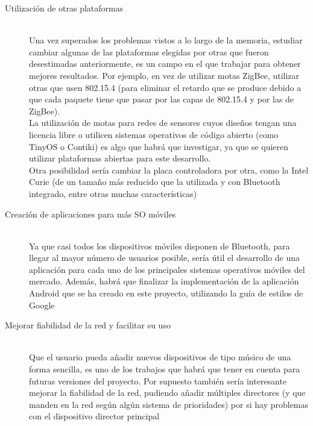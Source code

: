 \begin{description}
    \item[Utilización de otras plataformas] \hfill \\
      Una vez superados los problemas vistos a lo largo de la memoria, estudiar cambiar algunas de las plataformas
      elegidas por otras que fueron desestimadas anteriormente, es un campo en el que trabajar para obtener mejores
      resultados. Por ejemplo, en vez de utilizar motas ZigBee, utilizar otras que usen 802.15.4 (para eliminar
      el retardo que se produce debido a que cada paquete tiene que pasar por las capas de 802.15.4 y por las de ZigBee).\\
      La utilización de motas para redes de sensores cuyos diseños tengan una licencia libre o utilicen sistemas
      operativos de código abierto (como TinyOS o Contiki) es algo que habrá que investigar, ya que se quieren
      utilizar plataformas abiertas para este desarrollo.\\
      Otra posibilidad sería cambiar la placa controladora por otra, como la Intel Curie (de un tamaño más reducido
      que la utilizada y con Bluetooth integrado, entre otras muchas características)\\

    \item[Creación de aplicaciones para más SO móviles] \hfill \\
      Ya que casi todos los dispositivos móviles disponen de Bluetooth, para llegar al mayor número de usuarios
      posible, sería útil el desarrollo de una aplicación para cada uno de los principales sistemas operativos
      móviles del mercado. Además, habrá que finalizar la implementación de la aplicación Android que se ha creado
      en este proyecto, utilizando la guía de estilos de Google

     \item[Mejorar fiabilidad de la red y facilitar su uso] \hfill \\
      Que el usuario pueda añadir nuevos dispositivos de tipo músico de una forma sencilla, es uno de los
      trabajos que habrá que tener en cuenta para futuras versiones del proyecto. Por supuesto
      también sería interesante mejorar la fiabilidad de la red, pudiendo añadir múltiples directores
      (y que manden en la red según algún sistema de prioridades) por si hay problemas con el
      dispositivo director principal

\end{description}

